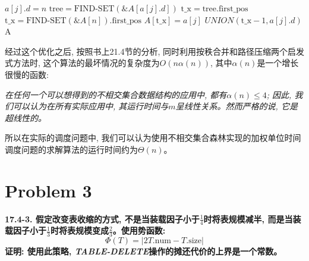 \documentclass[paper=a4, fontsize=11pt]{scrartcl} %
\numberwithin{equation}{section} %
\numberwithin{figure}{section} %
\numberwithin{table}{section} %
\begin{document}
\begin{enumerate}[a]
\begin{algorithm}[H]
\begin{algorithmic}
      \State $a[j].d = n$
      \EndIf
      \State $\mbox{tree} = \mbox{FIND-SET}(\&A[a[j].d])$
      \State $\mbox{t\_x} = \mbox{tree}.\mbox{first\_pos}$
      \State $\mbox{t\_x} = \mbox{FIND-SET}(\&A[n]).\mbox{first\_pos}$ 
      \EndIf
      \State $A[\mbox{t\_x}] = a[j]$ 
      \State $UNION(\mbox{t\_x} - 1, a[j].d)$ 
      \EndFor
      \Return A
    \end{algorithmic}
  \end{algorithm}

  经过这个优化之后, 按照书上21.4节的分析, 同时利用按秩合并和路径压缩两个启发式方法时, 这个算法的最坏情况的复杂度为$O(n \alpha(n))$, 其中$\alpha(n)$是一个增长很慢的函数:

  \begin{addmargin}[2em]{2em}
    \textit{在任何一个可以想得到的不相交集合数据结构的应用中, 都有$\alpha(n) \leq 4$; 因此, 我们可以认为在所有实际应用中, 其运行时间与$m$呈线性关系。然而严格的说, 它是超线性的。}
  \end{addmargin}

  所以在实际的调度问题中, 我们可以认为使用不相交集合森林实现的加权单位时间调度问题的求解算法的运行时间约为$\Theta(n)$。
\end{enumerate}

\section{Problem 3}
\textbf{17.4-3. 假定改变表收缩的方式, 不是当装载因子小于$\frac{1}{4}$时将表规模减半, 而是当装载因子小于$\frac{1}{3}$时将表规模变成$\frac{2}{3}$。使用势函数:}
\[
\Phi(T) = | 2 T.\mbox{num} - T.\mbox{size} |
\]
\textbf{证明: 使用此策略, \textit{TABLE-DELETE}操作的摊还代价的上界是一个常数。}
\end{document}
